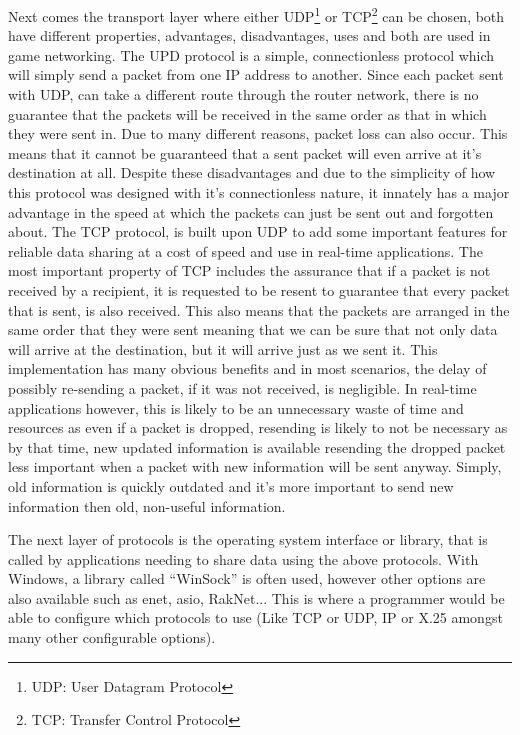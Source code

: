 Next comes the transport layer where either UDP\footnote{UDP: User Datagram Protocol} or TCP\footnote{TCP: Transfer Control Protocol}  can be chosen, both have different properties, advantages, disadvantages, uses and both are used in game networking. The UPD protocol is a simple, connectionless protocol which will simply send a packet from one IP address to another. Since each packet sent with UDP, can take a different route through the router network, there is no guarantee that the packets will be received in the same order as that in which they were sent in. Due to many different reasons, packet loss can also occur. This means that it cannot be guaranteed that a sent packet will even arrive at it's destination at all. Despite these disadvantages and due to the simplicity of how this protocol was designed with it's connectionless nature, it innately has a major advantage in the speed at which the packets can just be sent out and forgotten about. The TCP protocol, is built upon UDP to add some important features for reliable data sharing at a cost of speed and use in real-time applications. The most important property of TCP includes the assurance that if a packet is not received by a recipient, it is requested to be resent to guarantee that every packet that is sent, is also received. This also means that the packets are arranged in the same order that they were sent meaning that we can be sure that not only data will arrive at the destination, but it will arrive just as we sent it. This implementation has many obvious benefits and in most scenarios, the delay of possibly re-sending a packet, if it was not received, is negligible. In real-time applications however, this is likely to be an unnecessary waste of time and resources as even if a packet is dropped, resending is likely to not be necessary as by that time, new updated information is available resending the dropped packet less important  when a packet with new information will be sent anyway. Simply, old information is quickly outdated and it's more important to send new information then old, non-useful information.

The next layer of protocols is the operating system interface or library, that is called by applications needing to share data using the above protocols. With Windows, a library called ``WinSock'' is often used, however other options are also available such as enet, asio, RakNet... This is where a programmer would be able to configure which protocols to use (Like TCP or UDP, IP or X.25 amongst many other configurable options).


